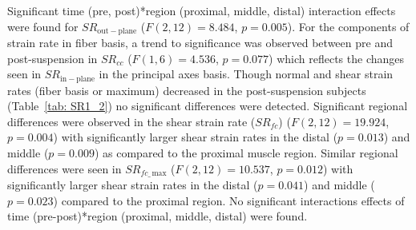 Significant time (pre, post)*region (proximal, middle, distal) interaction effects were found for $SR_{\mathrm{out-plane}}$ ($F(2, 12) = 8.484$, $p=0.005$). 
For the components of strain rate in fiber basis, a trend to significance was observed between pre and post-suspension in $SR_{cc}$ ($F(1,6) = 4.536$, $p=0.077$) which reflects the changes seen in $SR_{\mathrm{in-plane}}$ in the principal axes basis. 
Though normal and shear strain rates (fiber basis or maximum) decreased in the post-suspension subjects (Table~\ref{tab: SR1_2}) no significant differences were detected.
Significant regional differences were observed in the shear strain rate ($SR_{fc}$) ($F(2,12) = 19.924$, $p = 0.004$) with significantly larger shear strain rates in the distal ($p = 0.013$) and middle ($p = 0.009$) as compared to the proximal muscle region. 
Similar regional differences were seen in $SR_{fc\_\,\mathrm{max}}$ ($F(2,12) = 10.537$, $p = 0.012$) with significantly larger shear strain rates in the distal ($p = 0.041$) and middle ($p = 0.023$) compared to the proximal region. 
No significant interactions effects of time (pre-post)*region (proximal, middle, distal) were found.


